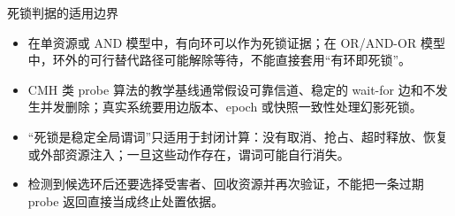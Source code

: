 \documentclass[UTF8,fontset=none,aspectratio=169,10pt]{beamer}
\begin{document}
\begin{frame}{死锁判据的适用边界}
\small
\begin{itemize}
  \item 在单资源或 AND 模型中，有向环可以作为死锁证据；在 OR/AND-OR 模型中，环外的可行替代路径可能解除等待，不能直接套用“有环即死锁”。
  \item CMH 类 probe 算法的教学基线通常假设可靠信道、稳定的 wait-for 边和不发生并发删除；真实系统要用边版本、epoch 或快照一致性处理幻影死锁。
  \item “死锁是稳定全局谓词”只适用于封闭计算：没有取消、抢占、超时释放、恢复或外部资源注入；一旦这些动作存在，谓词可能自行消失。
  \item 检测到候选环后还要选择受害者、回收资源并再次验证，不能把一条过期 probe 返回直接当成终止处置依据。
\end{itemize}
\vfill
{}
\end{frame}
\end{document}
